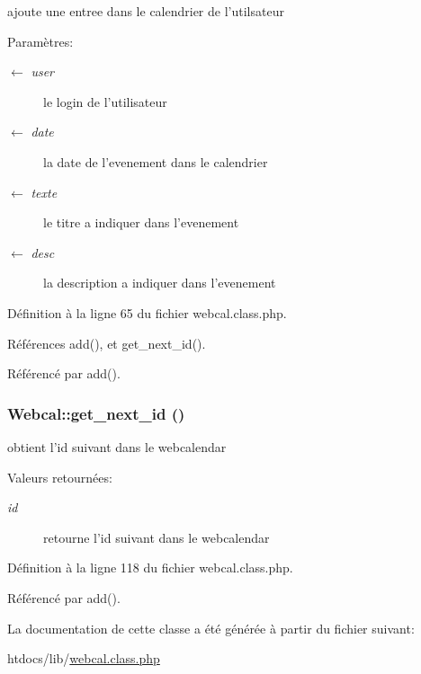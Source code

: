 ajoute une entree dans le calendrier de l'utilsateur 

\begin{Desc}
\item[Param\`{e}tres:]
\begin{description}
\item[\mbox{$\leftarrow$} {\em user}]le login de l'utilisateur \item[\mbox{$\leftarrow$} {\em date}]la date de l'evenement dans le calendrier \item[\mbox{$\leftarrow$} {\em texte}]le titre a indiquer dans l'evenement \item[\mbox{$\leftarrow$} {\em desc}]la description a indiquer dans l'evenement \end{description}
\end{Desc}


D\'{e}finition \`{a} la ligne 65 du fichier webcal.class.php.

R\'{e}f\'{e}rences add(), et get\_\-next\_\-id().

R\'{e}f\'{e}renc\'{e} par add().\hypertarget{classWebcal_a2}{
\subsubsection[get\_\-next\_\-id]{\setlength{\rightskip}{0pt plus 5cm}Webcal::get\_\-next\_\-id ()}}
\label{classWebcal_a2}


obtient l'id suivant dans le webcalendar 

\begin{Desc}
\item[Valeurs retourn\'{e}es:]
\begin{description}
\item[{\em id}]retourne l'id suivant dans le webcalendar \end{description}
\end{Desc}


D\'{e}finition \`{a} la ligne 118 du fichier webcal.class.php.

R\'{e}f\'{e}renc\'{e} par add().

La documentation de cette classe a \'{e}t\'{e} g\'{e}n\'{e}r\'{e}e \`{a} partir du fichier suivant:\begin{CompactItemize}
\item 
htdocs/lib/\hyperlink{webcal_8class_8php}{webcal.class.php}\end{CompactItemize}

